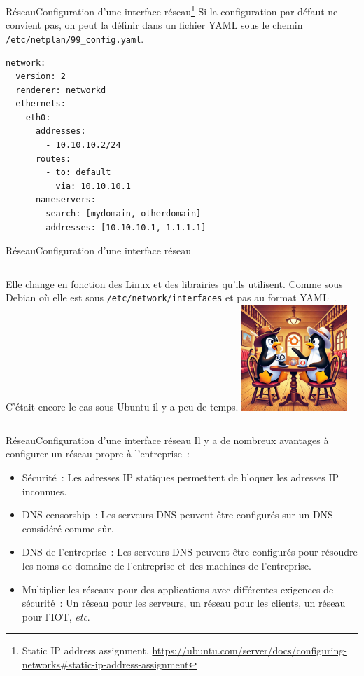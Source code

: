 \documentclass{beamer}
\begin{document}
    \begin{frame}[fragile]{Réseau}{Configuration d'une interface réseau\footnote{Static IP address assignment, \url{https://ubuntu.com/server/docs/configuring-networks\#static-ip-address-assignment}}}
        Si la configuration par défaut ne convient pas, on peut la définir dans un fichier YAML sous le chemin \lstinline{/etc/netplan/99_config.yaml}.
        \begin{lstlisting}
network:
  version: 2
  renderer: networkd
  ethernets:
    eth0:
      addresses:
        - 10.10.10.2/24
      routes:
        - to: default
          via: 10.10.10.1
      nameservers:
        search: [mydomain, otherdomain]
        addresses: [10.10.10.1, 1.1.1.1]
        \end{lstlisting}
    \end{frame}

    \begin{frame}{Réseau}{Configuration d'une interface réseau}
        \begin{columns}
            Elle change en fonction des Linux et des librairies qu'ils utilisent.
            \bigbreak
            Comme sous Debian où elle est sous \lstinline{/etc/network/interfaces} et pas au format YAML~.
            C'était encore le cas sous Ubuntu il y a peu de temps.
            \includegraphics[width=4cm]{image/pinguin-arguing}
        \end{columns}
    \end{frame}

    \begin{frame}{Réseau}{Configuration d'une interface réseau}
        Il y a de nombreux avantages à configurer un réseau propre à l'entreprise~:
        \begin{itemize}
            \item Sécurité~: Les adresses IP statiques permettent de bloquer les adresses IP inconnues.
            \item DNS censorship~: Les serveurs DNS peuvent être configurés sur un DNS considéré comme sûr.
            \item DNS de l'entreprise~: Les serveurs DNS peuvent être configurés pour résoudre les noms de domaine de l'entreprise et des machines de l'entreprise.
            \item Multiplier les réseaux pour des applications avec différentes exigences de sécurité~: Un réseau pour les serveurs, un réseau pour les clients, un réseau pour l'IOT, \textit{etc}.
        \end{itemize}
    \end{frame}
\end{document}
